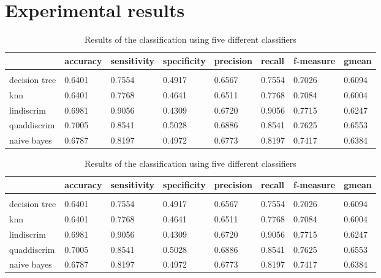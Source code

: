 \documentclass{article} %
\begin{document}
\section{Experimental results}

\begin{table}[h]
\caption{Results of the classification using five different classifiers}
\label{classification}
\begin{center}
\begin{tabular}{@{}llllllll@{}}
                 & accuracy & sensitivity & specificity & precision & recall & f-measure & gmean \\
                 \hline \\
decision tree    & 0.6401   & 0.7554      & 0.4917      & 0.6567    & 0.7554 & 0.7026     & 0.6094 \\
knn              & 0.6401   & 0.7768      & 0.4641      & 0.6511    & 0.7768 & 0.7084     & 0.6004 \\
lindiscrim       & 0.6981   & 0.9056      & 0.4309      & 0.6720    & 0.9056 & 0.7715     & 0.6247 \\
quaddiscrim      & 0.7005   & 0.8541      & 0.5028      & 0.6886    & 0.8541 & 0.7625     & 0.6553 \\
naive bayes      & 0.6787   & 0.8197      & 0.4972      & 0.6773    & 0.8197 & 0.7417     & 0.6384 \\  
\end{tabular}
\end{center}
\end{table}

\begin{table}[h]
\caption{Results of the classification using five different classifiers}
\label{classification}
\begin{center}
\begin{tabular}{@{}llllllll@{}}
                 & accuracy & sensitivity & specificity & precision & recall & f-measure & gmean \\
                 \hline \\
decision tree    & 0.6401   & 0.7554      & 0.4917      & 0.6567    & 0.7554 & 0.7026     & 0.6094 \\
knn              & 0.6401   & 0.7768      & 0.4641      & 0.6511    & 0.7768 & 0.7084     & 0.6004 \\
lindiscrim       & 0.6981   & 0.9056      & 0.4309      & 0.6720    & 0.9056 & 0.7715     & 0.6247 \\
quaddiscrim      & 0.7005   & 0.8541      & 0.5028      & 0.6886    & 0.8541 & 0.7625     & 0.6553 \\
naive bayes      & 0.6787   & 0.8197      & 0.4972      & 0.6773    & 0.8197 & 0.7417     & 0.6384 \\  
\end{tabular}
\end{center}
\end{table}
\end{document}
